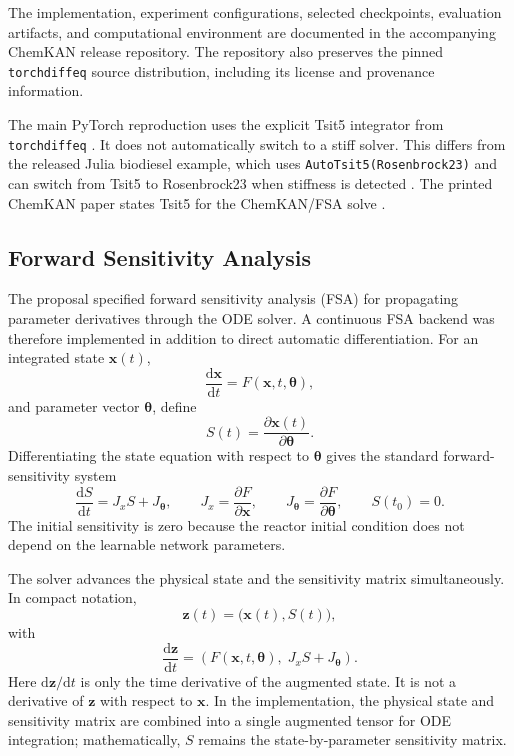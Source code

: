\documentclass[11pt,a4paper]{article}
\newcommand{\dd}{\mathrm{d}}
\begin{document}
The implementation, experiment configurations, selected checkpoints, evaluation artifacts, and computational environment are documented in the accompanying ChemKAN release repository. The repository also preserves the pinned \texttt{torchdiffeq} source distribution, including its license and provenance information.

The main PyTorch reproduction uses the explicit Tsit5 integrator from \texttt{torchdiffeq} \cite{torchdiffeq}. It does not automatically switch to a stiff solver. This differs from the released Julia biodiesel example, which uses \texttt{AutoTsit5(Rosenbrock23)} and can switch from Tsit5 to Rosenbrock23 when stiffness is detected \cite{ChemKANRepo2026}. The printed ChemKAN paper states Tsit5 for the ChemKAN/FSA solve \cite{Koenig_2025}.



\subsection{Forward Sensitivity Analysis}

The proposal specified forward sensitivity analysis (FSA) for propagating parameter derivatives through the ODE solver. A continuous FSA backend was therefore implemented in addition to direct automatic differentiation. For an integrated state $\mathbf{x}(t)$,
\begin{equation}
    \frac{\dd\mathbf{x}}{\dd t}=F(\mathbf{x},t,\boldsymbol{\theta}),
\end{equation}
and parameter vector $\boldsymbol{\theta}$, define
\begin{equation}
    S(t)=\frac{\partial\mathbf{x}(t)}{\partial\boldsymbol{\theta}}.
\end{equation}
Differentiating the state equation with respect to $\boldsymbol{\theta}$ gives the standard forward-sensitivity system~\cite{SciMLSensitivityMath}
\begin{equation}
    \frac{\dd S}{\dd t}=J_xS+J_{\boldsymbol{\theta}},\qquad
    J_x=\frac{\partial F}{\partial\mathbf{x}},\qquad
    J_{\boldsymbol{\theta}}=\frac{\partial F}{\partial\boldsymbol{\theta}},\qquad
    S(t_0)=0.
\end{equation}
The initial sensitivity is zero because the reactor initial condition does not depend on the learnable network parameters.

The solver advances the physical state and the sensitivity matrix simultaneously. In compact notation,
\begin{equation}
    \mathbf{z}(t)=\big(\mathbf{x}(t),S(t)\big),
\end{equation}
with
\begin{equation}
    \frac{\dd\mathbf{z}}{\dd t}
    =\left(F(\mathbf{x},t,\boldsymbol{\theta}),\;J_xS+J_{\boldsymbol{\theta}}\right).
\end{equation}
Here $\dd\mathbf{z}/\dd t$ is only the time derivative of the augmented state. It is not a derivative of $\mathbf{z}$ with respect to $\mathbf{x}$. In the implementation, the physical state and sensitivity matrix are combined into a single augmented tensor for ODE integration; mathematically, \(S\) remains the state-by-parameter sensitivity matrix.
\end{document}
